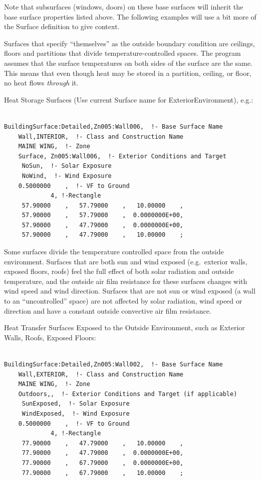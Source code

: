 Note that subsurfaces (windows, doors) on these base surfaces will inherit the base surface properties listed above. The following examples will use a bit more of the Surface definition to give context.

Surfaces that specify ``themselves'' as the outside boundary condition are ceilings, floors and partitions that divide temperature-controlled spaces. The program assumes that the surface temperatures on both sides of the surface are the same. This means that even though heat may be stored in a partition, ceiling, or floor, no heat flows \emph{through} it.

Heat Storage Surfaces (Use current Surface name for ExteriorEnvironment), e.g.:

\begin{lstlisting}

BuildingSurface:Detailed,Zn005:Wall006,  !- Base Surface Name
    Wall,INTERIOR,  !- Class and Construction Name
    MAINE WING,  !- Zone
    Surface, Zn005:Wall006,  !- Exterior Conditions and Target
     NoSun,  !- Solar Exposure
     NoWind,  !- Wind Exposure
    0.5000000    ,  !- VF to Ground
             4, !-Rectangle
     57.90000    ,   57.79000    ,   10.00000    ,
     57.90000    ,   57.79000    ,  0.0000000E+00,
     57.90000    ,   47.79000    ,  0.0000000E+00,
     57.90000    ,   47.79000    ,   10.00000    ;
\end{lstlisting}

Some surfaces divide the temperature controlled space from the outside environment. Surfaces that are both sun and wind exposed (e.g.~exterior walls, exposed floors, roofs) feel the full effect of both solar radiation and outside temperature, and the outside air film resistance for these surfaces changes with wind speed and wind direction. Surfaces that are not sun or wind exposed (a wall to an ``uncontrolled'' space) are not affected by solar radiation, wind speed or direction and have a constant outside convective air film resistance.

Heat Transfer Surfaces Exposed to the Outside Environment, such as Exterior Walls, Roofs, Exposed Floors:

\begin{lstlisting}

BuildingSurface:Detailed,Zn005:Wall002,  !- Base Surface Name
    Wall,EXTERIOR,  !- Class and Construction Name
    MAINE WING,  !- Zone
    Outdoors,,  !- Exterior Conditions and Target (if applicable)
     SunExposed,  !- Solar Exposure
     WindExposed,  !- Wind Exposure
    0.5000000    ,  !- VF to Ground
             4, !-Rectangle
     77.90000    ,   47.79000    ,   10.00000    ,
     77.90000    ,   47.79000    ,  0.0000000E+00,
     77.90000    ,   67.79000    ,  0.0000000E+00,
     77.90000    ,   67.79000    ,   10.00000    ;
\end{lstlisting}

